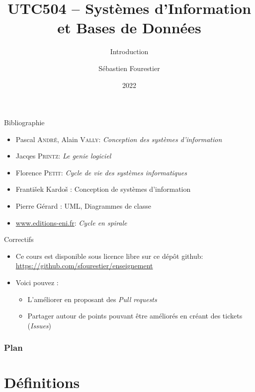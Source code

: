 \documentclass[14pt]{beamer}
\title{UTC504 -- Systèmes d'Information et Bases de Données}
\subtitle{Introduction}
\author{Sébastien Fourestier}
\date{2022}
\begin{document}
\frame{\titlepage}

\begin{framentitle}{Bibliographie}
    \begin{itemize}
        \item Pascal \textsc{André}, Alain \textsc{Vally}: \emph{Conception des systèmes
            d'information}
        \item Jacqes \textsc{Printz}: \emph{Le genie logiciel}
        \item Florence \textsc{Petit}: \emph{Cycle de vie des
            systèmes informatiques}
        \item František Kardoš : Conception de systèmes d'information
        \item Pierre Gérard : UML, Diagrammes de classe
        \item \url{www.editions-eni.fr}: \emph{Cycle en spirale}
    \end{itemize}
\end{framentitle}

\begin{framentitle}{Correctifs}
    \begin{itemize}
        \item Ce cours est disponible sous licence libre sur ce dépôt github:\\
            \small{\url{https://github.com/sfourestier/enseignement}}
        \item[\ra] Voici pouvez :
            \begin{itemize}
                \item L'améliorer en proposant des \emph{Pull requests}
                \item Partager autour de points pouvant être améliorés en créant des
                    tickets (\emph{Issues})
            \end{itemize}
    \end{itemize}
\end{framentitle}

\begin{frame}
    \frametitle{Plan}
    \tableofcontents
\end{frame}

\section{Définitions}

\end{document}
